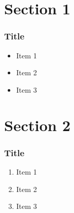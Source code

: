 \documentclass[10pt, aspectratio=169, compress, protectframetitle, handout]{beamer}
\begin{document}


\section{Section 1}
\begin{frame}
  \frametitle{Title}
  \begin{itemize}
    \item Item 1
    \item Item 2
    \item Item 3
  \end{itemize}
\end{frame}

\section{Section 2}
\begin{frame}
  \frametitle{Title}
  \begin{enumerate}
    \item Item 1
    \item Item 2
    \item Item 3
  \end{enumerate}
\end{frame}
\end{document}
